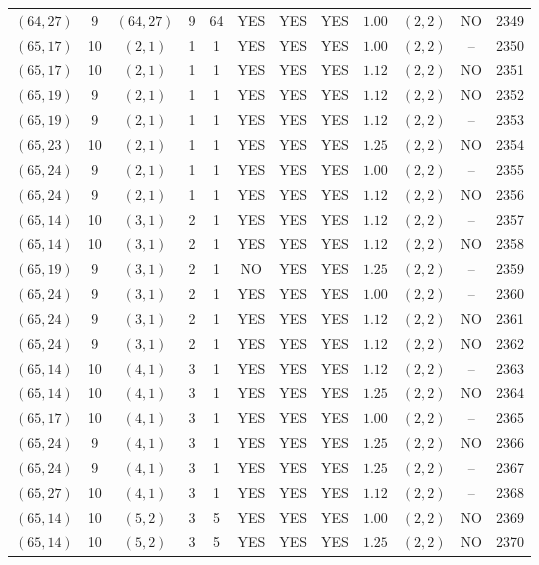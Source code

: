 \begin{longtable}{|c|c|c|c|c|c|c|c|c|c|c|c|}
$(64,27)$ & 9 & $(64,27)$ & 9 & 64 & YES & YES & YES & $1.00$ & $(2,2)$ & NO & 2349\\
$(65,17)$ & 10 & $(2,1)$ & 1 & 1 & YES & YES & YES & $1.00$ & $(2,2)$ & -- & 2350\\
$(65,17)$ & 10 & $(2,1)$ & 1 & 1 & YES & YES & YES & $1.12$ & $(2,2)$ & NO & 2351\\
$(65,19)$ & 9 & $(2,1)$ & 1 & 1 & YES & YES & YES & $1.12$ & $(2,2)$ & NO & 2352\\
$(65,19)$ & 9 & $(2,1)$ & 1 & 1 & YES & YES & YES & $1.12$ & $(2,2)$ & -- & 2353\\
$(65,23)$ & 10 & $(2,1)$ & 1 & 1 & YES & YES & YES & $1.25$ & $(2,2)$ & NO & 2354\\
$(65,24)$ & 9 & $(2,1)$ & 1 & 1 & YES & YES & YES & $1.00$ & $(2,2)$ & -- & 2355\\
$(65,24)$ & 9 & $(2,1)$ & 1 & 1 & YES & YES & YES & $1.12$ & $(2,2)$ & NO & 2356\\
$(65,14)$ & 10 & $(3,1)$ & 2 & 1 & YES & YES & YES & $1.12$ & $(2,2)$ & -- & 2357\\
$(65,14)$ & 10 & $(3,1)$ & 2 & 1 & YES & YES & YES & $1.12$ & $(2,2)$ & NO & 2358\\
$(65,19)$ & 9 & $(3,1)$ & 2 & 1 & NO & YES & YES & $1.25$ & $(2,2)$ & -- & 2359\\
$(65,24)$ & 9 & $(3,1)$ & 2 & 1 & YES & YES & YES & $1.00$ & $(2,2)$ & -- & 2360\\
$(65,24)$ & 9 & $(3,1)$ & 2 & 1 & YES & YES & YES & $1.12$ & $(2,2)$ & NO & 2361\\
$(65,24)$ & 9 & $(3,1)$ & 2 & 1 & YES & YES & YES & $1.12$ & $(2,2)$ & NO & 2362\\
$(65,14)$ & 10 & $(4,1)$ & 3 & 1 & YES & YES & YES & $1.12$ & $(2,2)$ & -- & 2363\\
$(65,14)$ & 10 & $(4,1)$ & 3 & 1 & YES & YES & YES & $1.25$ & $(2,2)$ & NO & 2364\\
$(65,17)$ & 10 & $(4,1)$ & 3 & 1 & YES & YES & YES & $1.00$ & $(2,2)$ & -- & 2365\\
$(65,24)$ & 9 & $(4,1)$ & 3 & 1 & YES & YES & YES & $1.25$ & $(2,2)$ & NO & 2366\\
$(65,24)$ & 9 & $(4,1)$ & 3 & 1 & YES & YES & YES & $1.25$ & $(2,2)$ & -- & 2367\\
$(65,27)$ & 10 & $(4,1)$ & 3 & 1 & YES & YES & YES & $1.12$ & $(2,2)$ & -- & 2368\\
$(65,14)$ & 10 & $(5,2)$ & 3 & 5 & YES & YES & YES & $1.00$ & $(2,2)$ & NO & 2369\\
$(65,14)$ & 10 & $(5,2)$ & 3 & 5 & YES & YES & YES & $1.25$ & $(2,2)$ & NO & 2370\\

\end{longtable}
